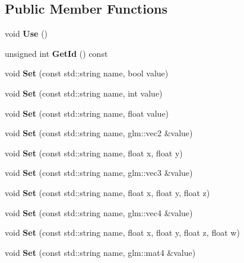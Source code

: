 \subsection*{Public Member Functions}
\begin{DoxyCompactItemize}
\item 
\mbox{\label{classTarbora_1_1Shader_a7eeffc11821cbe5b613365a7af93e542}} 
void {\bfseries Use} ()
\item 
\mbox{\label{classTarbora_1_1Shader_ab38ca48a50f3896091a958650af783b7}} 
unsigned int {\bfseries Get\+Id} () const
\item 
\mbox{\label{classTarbora_1_1Shader_a1d4c94b319d673db95bcc01bb3d72e69}} 
void {\bfseries Set} (const std\+::string name, bool value)
\item 
\mbox{\label{classTarbora_1_1Shader_aee082db2bc1f0101651d42deae76407a}} 
void {\bfseries Set} (const std\+::string name, int value)
\item 
\mbox{\label{classTarbora_1_1Shader_a8289b6cde77982f11e50ce40c35675cd}} 
void {\bfseries Set} (const std\+::string name, float value)
\item 
\mbox{\label{classTarbora_1_1Shader_ae519e14286ec0619eeaae3a497d1bb22}} 
void {\bfseries Set} (const std\+::string name, glm\+::vec2 \&value)
\item 
\mbox{\label{classTarbora_1_1Shader_a4c052bde1bd5cc1c232f4d78b41d38c7}} 
void {\bfseries Set} (const std\+::string name, float x, float y)
\item 
\mbox{\label{classTarbora_1_1Shader_a1e760cb5c7ac2aca10e05187e22dbd4a}} 
void {\bfseries Set} (const std\+::string name, glm\+::vec3 \&value)
\item 
\mbox{\label{classTarbora_1_1Shader_a3aff4a5bfd18ee892d473e083342f7ae}} 
void {\bfseries Set} (const std\+::string name, float x, float y, float z)
\item 
\mbox{\label{classTarbora_1_1Shader_a467a3060f89c0b0d8f6f534b95e615f8}} 
void {\bfseries Set} (const std\+::string name, glm\+::vec4 \&value)
\item 
\mbox{\label{classTarbora_1_1Shader_abc0d7aa7d886da60d163c5308d0c3289}} 
void {\bfseries Set} (const std\+::string name, float x, float y, float z, float w)
\item 
\mbox{\label{classTarbora_1_1Shader_a49b3c9a5b3ad393ddb7639350483ab37}} 
void {\bfseries Set} (const std\+::string name, glm\+::mat4 \&value)
\end{DoxyCompactItemize}
